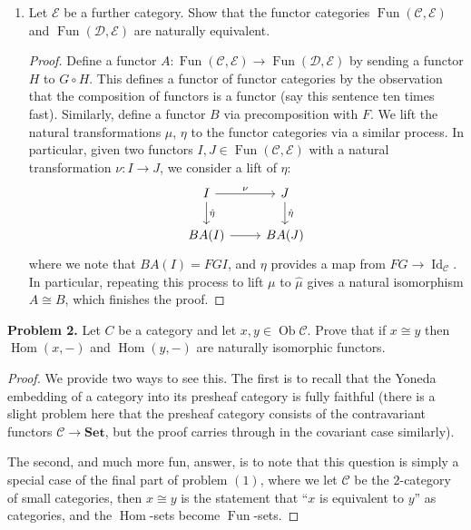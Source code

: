 \documentclass[reqno]{amsart}
\newcommand{\Set}{\mathbf{Set}}
\DeclareMathOperator{\Ob}{Ob}
\DeclareMathOperator{\Id}{Id}
\DeclareMathOperator{\Fun}{Fun}
\DeclareMathOperator{\Hom}{Hom}
\theoremstyle{definition}
\theoremstyle{remark}
\newcommand{\prob}[1] {
  \textbf{Problem #1.}
}
\begin{document}
\begin{enumerate}
  \item Let $\mathcal{E}$ be a further category. Show that the functor
    categories $\Fun(\mathcal{C}, \mathcal{E})$ and $\Fun(\mathcal{D},
    \mathcal{E})$ are naturally equivalent.

    \begin{proof}
      Define a functor $A : \Fun(\mathcal{C}, \mathcal{E}) \to \Fun(\mathcal{D},
      \mathcal{E})$ by sending a functor $H$ to $G \circ H$. This defines a
      functor of functor categories by the observation that the composition of
      functors is a functor (say this sentence ten times fast). Similarly,
      define a functor $B$ via precomposition with $F$. We lift the natural
      transformations $\mu$, $\eta$ to the functor categories via a similar
      process. In particular, given two functors $I, J \in \Fun(\mathcal{C},
      \mathcal{E})$ with a natural transformation $\nu : I \to J$, we consider a
      lift of $\eta$:
      \[
        \begin{tikzcd}
          I \ar[r, "\nu"] \ar[d, "\hat{\eta}"] & J \ar[d, "\hat{\eta}"] \\
          BA(I) \ar[r] & BA(J)
        \end{tikzcd}
      \]
      where we note that $BA(I) = F G I$, and $\eta$ provides a map from $FG \to
      \Id_\mathcal{C}$. In particular, repeating this process to lift $\mu$ to
      $\hat{\mu}$ gives a natural isomorphism $A \cong B$, which finishes the
      proof.
    \end{proof}
\end{enumerate}

\prob{2} Let $C$ be a category and let $x, y \in \Ob \mathcal{C}$. Prove that if
$x \cong y$ then $\Hom(x, -)$ and $\Hom(y, -)$ are naturally isomorphic
functors.

\begin{proof}
  We provide two ways to see this. The first is to recall that the Yoneda
  embedding of a category into its presheaf category is fully faithful (there is
  a slight problem here that the presheaf category consists of the contravariant
  functors $\mathcal{C} \to \Set$, but the proof carries through in the
  covariant case similarly).

  The second, and much more fun, answer, is to note that this question is simply
  a special case of the final part of problem $(1)$, where we let $\mathcal{C}$
  be the $2$-category of small categories, then $x \cong y$ is the statement
  that ``$x$ is equivalent to $y$'' as categories, and the $\Hom$-sets become
  $\Fun$-sets.
\end{proof}
\end{document}
